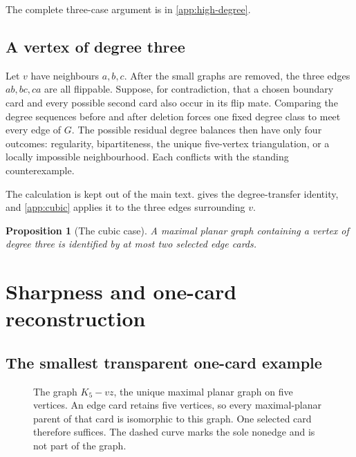 \documentclass[11pt]{article}
\newtheorem{proposition}[theorem]{Proposition}
\theoremstyle{definition}
\theoremstyle{remark}
\begin{document}
The complete three-case argument is in \cref{app:high-degree}.

\subsection{A vertex of degree three}

Let \(v\) have neighbours \(a,b,c\).  After the small graphs are removed,
the three edges \(ab,bc,ca\) are all flippable.  Suppose, for contradiction,
that a chosen boundary card and every possible second card also occur in its
flip mate.  Comparing the degree sequences before and after deletion forces
one fixed degree class to meet every edge of \(G\).  The possible residual
degree balances then have only four outcomes: regularity, bipartiteness, the
unique five-vertex triangulation, or a locally impossible neighbourhood.
Each conflicts with the standing counterexample.

The calculation is kept out of the main text.  
gives the degree-transfer identity, and \cref{app:cubic} applies it to the
three edges surrounding \(v\).

\begin{proposition}[The cubic case]\label{prop:cubic}
A maximal planar graph containing a vertex of degree three is identified by
at most two selected edge cards.
\end{proposition}

\section{Sharpness and one-card reconstruction}

\subsection{The smallest transparent one-card example}

\begin{figure}[htbp]
\centering
{}
\caption{The graph \(K_5-vz\), the unique maximal planar graph on five
vertices.  An edge card retains five vertices, so every maximal-planar parent
of that card is isomorphic to this graph.  One selected card therefore
suffices.  The dashed curve marks the sole nonedge and is not part of the
graph.}
\label{fig:one-card}
\end{figure}
\end{document}
